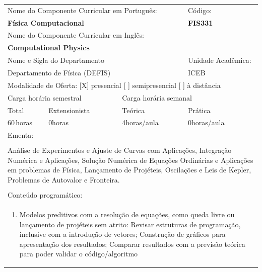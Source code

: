 \documentclass[11pt]{article}
\begin{document}
\begin{center}
\begin{longtable}{|p{4cm}|p{4cm}|p{4cm}|p{4cm}|}
\hline
\multicolumn{3}{|p{12cm}|}{Nome do Componente Curricular em Português:} &
\multicolumn{1}{p{4cm}|}{Código:} \\ 
\multicolumn{3}{|p{12cm}|}{\textbf{Física Computacional}} &
\textbf{FIS331}\\ 
\multicolumn{3}{|p{12cm}|}{Nome do Componente Curricular em Inglês:} & \\ 
\multicolumn{3}{|p{12cm}|}{\textbf{Computational Physics}} & \\ 
\hline
\multicolumn{3}{|p{12cm}|}{Nome e Sigla do Departamento} & Unidade Acadêmica: \\ 
\multicolumn{3}{|p{12cm}|}{Departamento de Física (DEFIS)} & {ICEB} \\ 
\hline
\multicolumn{4}{|p{16cm}|}{Modalidade de Oferta:
[X] presencial \hspace{0.6cm}
[ ] semipresencial \hspace{0.6cm}
[ ] à distância}\\
\hline
\multicolumn{2}{|p{8cm}|}{Carga horária semestral} &
\multicolumn{2}{p{8cm}|}{Carga horária semanal}\\
\hline
\multicolumn{1}{|p{4cm}|}{Total} &
\multicolumn{1}{p{4cm}|}{Extensionista} &
\multicolumn{1}{p{4cm}|}{Teórica} &
\multicolumn{1}{p{4cm}|}{Prática} \\ 
\multicolumn{1}{|p{4cm}|}{60\,horas} &
\multicolumn{1}{p{4cm}|}{0\;horas} &
\multicolumn{1}{p{4cm}|}{4\;horas/aula} &
\multicolumn{1}{p{4cm}|}{0\;horas/aula} \\ 
\hline
\multicolumn{4}{|p{16cm}|}{Ementa:}\\
\multicolumn{4}{|p{16cm}|}{}\\
\multicolumn{4}{|p{\dimexpr 16cm + 6\tabcolsep\relax}|}{Análise de Experimentos e Ajuste de Curvas com Aplicações, Integração Numérica e Aplicações, Solução Numérica de Equações Ordinárias e Aplicações em problemas de Física, Lançamento de Projéteis, Oscilações e Leis de Kepler, Problemas de Autovalor e Fronteira.}\\
\multicolumn{4}{|p{16cm}|}{}\\
\hline
\multicolumn{4}{|p{16cm}|}{Conteúdo programático:}\\*
\multicolumn{4}{|p{\dimexpr 16cm + 6\tabcolsep\relax}|}{\begin{enumerate}[start=1]\item Modelos preditivos com a resolução de equações, como queda livre ou lançamento de projéteis sem atrito: Revisar estruturas de programação, inclusive com a introdução de vetores; Construção de gráficos para apresentação dos resultados; Comparar resultados com a previsão teórica para poder validar o código/algoritmo\end{enumerate}}\\

\end{longtable}
\end{center}
\end{document}
